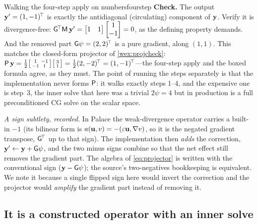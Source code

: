 \begin{workedexample}{Walking the four-step apply on numbers}{fourstep}
\medskip\noindent\textbf{Check.}
The output $\mathbf{y}'=(1,-1)^{\!\top}$ is exactly the antidiagonal (circulating)
component of $\mathbf{y}$. Verify it is divergence-free:
$\mathsf{G}^{\!\top}\mathsf{M}\,\mathbf{y}' = \begin{bmatrix}1&1\end{bmatrix}
\begin{bmatrix}1\\-1\end{bmatrix} = 0$, as the defining property demands. And the
removed part $\mathsf{G}\psi=(2,2)^{\!\top}$ is a pure gradient, along $(1,1)$. This
matches the closed-form projector of \cref{wex:projcheck}:
$\mathsf{P}\,\mathbf{y}=\tfrac12\bigl[\begin{smallmatrix}1&-1\\-1&1\end{smallmatrix}\bigr]
\bigl[\begin{smallmatrix}3\\1\end{smallmatrix}\bigr]=\tfrac12(2,-2)^{\!\top}
=(1,-1)^{\!\top}$---the four-step apply and the boxed formula agree, as they must.
The point of running the steps separately is that the implementation never forms
$\mathsf{P}$: it walks exactly steps 1--4, and the expensive one is step~3, the inner
solve that here was a trivial $2\psi=4$ but in production is a full
preconditioned CG solve on the scalar space.
\end{workedexample}

\begin{notationbox}
\emph{A sign subtlety, recorded.} In Palace the weak-divergence operator carries a
built-in $-1$ (its bilinear form is $a(\mathbf{u},v)=-(\varepsilon\mathbf{u},\nabla v)$, so it is
the negated gradient transpose, $\mathsf{G}^{\!\top}$ up to that sign). The
implementation then \emph{adds} the correction, $\mathbf{y}'\leftarrow\mathbf{y}+\mathsf{G}\psi$,
and the two minus signs combine so that the net effect still removes the gradient
part. The algebra of \cref{eq:projector} is written with the conventional sign
($\mathbf{y}-\mathsf{G}\psi$); the source's two-negatives bookkeeping is equivalent. We note
it because a single flipped sign here would invert the correction and the
projector would \emph{amplify} the gradient part instead of removing it.
\end{notationbox}

\subsection{It is a constructed operator with an inner solve}

